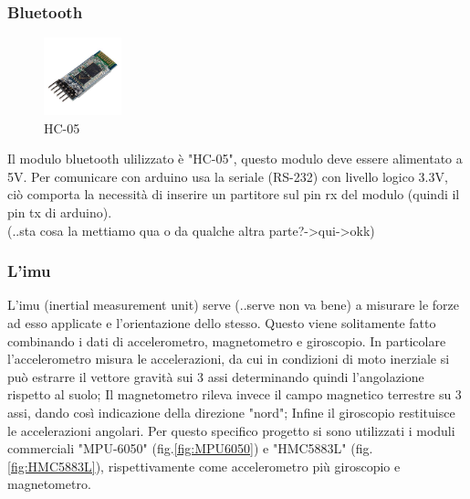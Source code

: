 \documentclass[10pt,a4paper]{article}
\begin{document}
\vspace{10pt}

\subsubsection{Bluetooth}
\begin{figure}
	\centering
	\vspace{-30pt}
	\includegraphics[width=0.2\textwidth]{HC-05.jpg}
	\vspace{-30pt}
	\caption{HC-05}
	\label{fig:HC-05}
	\vspace{-30pt}
\end{figure}
Il modulo bluetooth ulilizzato \`e "HC-05", questo modulo deve essere alimentato a 5V. Per comunicare con arduino usa la seriale (RS-232) con livello logico 3.3V, ci\`o comporta la necessit\`a di inserire un partitore sul pin rx del modulo (quindi il pin tx di arduino).
\\
(..sta cosa la mettiamo qua o da qualche altra parte?->qui->okk)

\hfill \break
\hfill \break
\hfill \break


\subsubsection{L'imu}

L'imu (inertial measurement unit) serve (..serve non va bene) a misurare le forze ad esso applicate e l'orientazione dello stesso. Questo viene solitamente fatto combinando i dati di accelerometro, magnetometro e giroscopio. In particolare l'accelerometro misura le accelerazioni, da cui in condizioni di moto inerziale si pu\`o estrarre il vettore gravit\`a sui 3 assi determinando quindi l'angolazione rispetto al suolo; Il magnetometro rileva invece il campo magnetico terrestre su 3 assi, dando cos\`i indicazione della direzione "nord"; Infine il giroscopio restituisce le accelerazioni angolari.
Per questo specifico progetto si sono utilizzati i moduli commerciali "MPU-6050" (fig.\ref{fig:MPU6050}) e "HMC5883L" (fig.\ref{fig:HMC5883L}), rispettivamente come accelerometro pi\`u giroscopio e magnetometro. 
\end{document}
